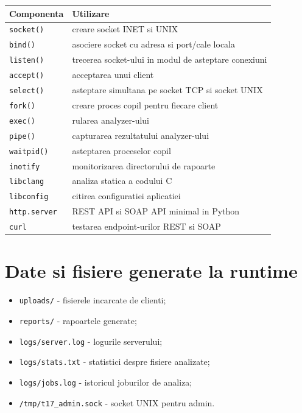 \documentclass[12pt,a4paper]{article}
\begin{document}
\begin{longtable}{|p{5cm}|p{9cm}|}
\hline
Componenta & Utilizare \\
\hline
\texttt{socket()} & creare socket INET si UNIX \\
\hline
\texttt{bind()} & asociere socket cu adresa si port/cale locala \\
\hline
\texttt{listen()} & trecerea socket-ului in modul de asteptare conexiuni \\
\hline
\texttt{accept()} & acceptarea unui client \\
\hline
\texttt{select()} & asteptare simultana pe socket TCP si socket UNIX \\
\hline
\texttt{fork()} & creare proces copil pentru fiecare client \\
\hline
\texttt{exec()} & rularea analyzer-ului \\
\hline
\texttt{pipe()} & capturarea rezultatului analyzer-ului \\
\hline
\texttt{waitpid()} & asteptarea proceselor copil \\
\hline
\texttt{inotify} & monitorizarea directorului de rapoarte \\
\hline
\texttt{libclang} & analiza statica a codului C \\
\hline
\texttt{libconfig} & citirea configuratiei aplicatiei \\
\hline
\texttt{http.server} & REST API si SOAP API minimal in Python \\
\hline
\texttt{curl} & testarea endpoint-urilor REST si SOAP \\
\hline
\end{longtable}

\section{Date si fisiere generate la runtime}

\begin{itemize}
    \item \texttt{uploads/} - fisierele incarcate de clienti;
    \item \texttt{reports/} - rapoartele generate;
    \item \texttt{logs/server.log} - logurile serverului;
    \item \texttt{logs/stats.txt} - statistici despre fisiere analizate;
    \item \texttt{logs/jobs.log} - istoricul joburilor de analiza;
    \item \texttt{/tmp/t17\_admin.sock} - socket UNIX pentru admin.
\end{itemize}
\end{document}
